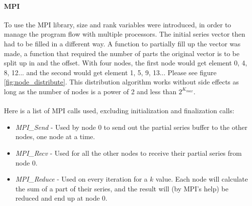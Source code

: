 \documentclass{article}
\begin{document}
\paragraph{MPI}
To use the MPI library, size and rank variables were introduced, in order to manage the program flow with multiple processors. The initial series vector then had to be filled in a different way. A function to partially fill up the vector was made, a function that required the number of parts the original vector is to be split up in and the offset.  With four nodes, the first node would get element 0, 4, 8, 12... and the second would get element 1, 5, 9, 13... Please see figure \ref{fig:node_distribute}. This distribution algorithm works without side effects as long as the number of nodes is a power of 2 and less than $2^{K_{max}}$.
\\
\\ Here is a list of MPI calls used, excluding initialization and finalization calls:
\begin{itemize}
	\item \emph{MPI\_Send} - Used by node 0 to send out the partial series buffer to the other nodes, one node at a time.
	\item \emph{MPI\_Recv} - Used for all the other nodes to receive their partial series from node 0.
	\item \emph{MPI\_Reduce} - Used on every iteration for a $k$ value. Each node will calculate the sum of a part of their series, and the result will (by MPI's help) be reduced and end up at node 0.
\end{itemize}
\end{document}
